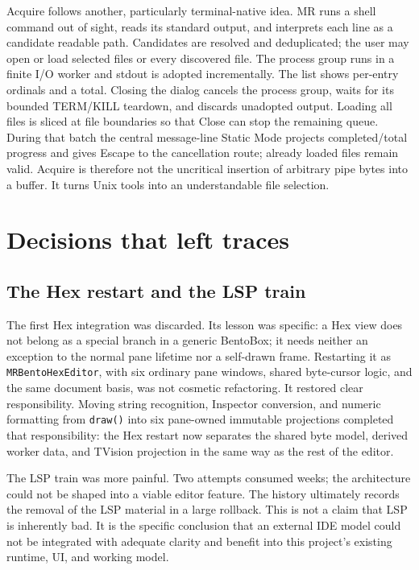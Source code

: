 \documentclass[a4paper,10pt,twoside,openany]{book}
\newcommand{\mr}{\textsc{MR}}
\begin{document}
Acquire follows another, particularly terminal-native idea. \mr{} runs a
shell command out of sight, reads its standard output, and interprets each line
as a candidate readable path. Candidates are resolved and deduplicated; the
user may open or load selected files or every discovered file. The process
group runs in a finite I/O worker and stdout is adopted incrementally. The list
shows per-entry ordinals and a total. Closing the dialog cancels the process
group, waits for its bounded TERM/KILL teardown, and discards unadopted output.
Loading all files is sliced at file boundaries so that Close can stop the
remaining queue. During that batch the central message-line Static Mode
projects completed/total progress and gives Escape to the cancellation route;
already loaded files remain valid. Acquire is therefore not the uncritical
insertion of arbitrary pipe bytes into a buffer. It turns Unix tools into an
understandable file selection.

\part{Decisions that left traces}

\chapter{The Hex restart and the LSP train}

The first Hex integration was discarded. Its lesson was specific: a Hex view
does not belong as a special branch in a generic BentoBox; it needs neither an
exception to the normal pane lifetime nor a self-drawn frame. Restarting it as
\texttt{MRBentoHexEditor}, with six ordinary pane windows, shared byte-cursor
logic, and the same document basis, was not cosmetic refactoring. It restored
clear responsibility. Moving string recognition, Inspector conversion, and
numeric formatting from \texttt{draw()} into six pane-owned immutable
projections completed that responsibility: the Hex restart now separates the
shared byte model, derived worker data, and TVision projection in the same way
as the rest of the editor.

The LSP train was more painful. Two attempts consumed weeks; the architecture
could not be shaped into a viable editor feature. The history ultimately
records the removal of the LSP material in a large rollback. This is not a
claim that LSP is inherently bad. It is the specific conclusion that an
external IDE model could not be integrated with adequate clarity and benefit
into this project's existing runtime, UI, and working model.
\end{document}

